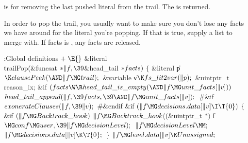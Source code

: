  is for removing the last pushed literal from the
trail. The
 is returned.

In order to pop the trail, you usually want to make sure you don't lose any
facts we have around for the literal you're popping. If that is true, supply a
list to merge with. If facts is \PB{$\NULL$}, any facts are released.

\Y\B\4:Global definitions\X${}\mathrel+\E{}$\6
\&{literal} \\{trailPop}(\&{funcsat} ${}{*}\|f,\39{}$\&{head\_tail} ${}{*}%
\\{facts}){}$\1\1\2\2\6
${}\{{}$\1\6
\&{literal} \|p${}\K\\{clausePeek}({\AND}\|f\MG\\{trail});{}$\6
\&{variable} \|v${}\K\\{fs\_lit2var}(\|p);{}$\6
\&{uintptr\_t} \\{reason\_ix};\7
\&{if} ${}(\\{facts}\W\R\\{head\_tail\_is\_empty}({\AND}\|f\MG\\{unit\_facts}[%
\|v])){}$\1\5
${}\\{head\_tail\_append}(\|f,\39\\{facts},\39{\AND}\|f\MG\\{unit\_facts}[%
\|v]);{}$\2\6
\8\#\&{if} \6
${}\\{exonerateClauses}(\|f,\39\|v);{}$\6
\8\#\&{endif}\6
\&{if} ${}(\|f\MG\\{decisions}.\\{data}[\|v]\I\T{0}){}$\5
${}\{{}$\1\6
\&{if} ${}(\|f\MG\\{Backtrack\_hook}){}$\1\5
${}\|f\MG\\{Backtrack\_hook}{}$((\&{uintptr\_t} ${}{*}){}$ \|f${}\MG\\{conf}\MG%
\\{user},\39\|f\MG\\{decisionLevel});{}$\2\6
${}\|f\MG\\{decisionLevel}\MM;{}$\6
${}\|f\MG\\{decisions}.\\{data}[\|v]\K\T{0};{}$\6
\4${}\}{}$\2\6
${}\|f\MG\\{level}.\\{data}[\|v]\K\\{Unassigned};{}$\6
